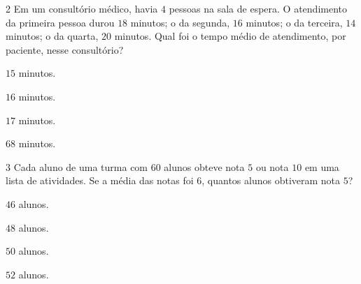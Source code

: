 {{{{\num{2}  Em um consultório médico, havia $4$ pessoas na sala de espera. O
atendimento da primeira pessoa durou $18$ minutos; o da segunda, $16$
minutos; o da terceira, $14$ minutos; o da quarta, $20$ minutos.
Qual foi o tempo médio de atendimento, por paciente, nesse consultório?

\begin{escolha}
\item $15$ minutos.
\item $16$ minutos.
\item $17$ minutos.
\item $68$ minutos.
\end{escolha}



\num{3}  Cada aluno de uma turma com $60$ alunos obteve nota $5$ ou nota $10$ em uma
lista de atividades. Se a média das notas foi $6$, quantos alunos
obtiveram nota $5$?

\begin{escolha}
\item $46$ alunos.
\item $48$ alunos.
\item $50$ alunos.
\item $52$ alunos.
\end{escolha}


}}}}
